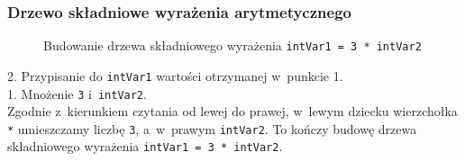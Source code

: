 \documentclass[10pt,t]{beamer}
\begin{document}
\begin{frame}
  \frametitle{Drzewo składniowe wyrażenia arytmetycznego}


  \begin{figure}


    \caption{Budowanie drzewa składniowego wyrażenia
      \texttt{intVar1 = 3 * intVar2}}

    \label{fig:Scheme-of-CPU}

  \end{figure}





  2. Przypisanie do \texttt{intVar1} wartości otrzymanej w~punkcie 1. \\
  1. Mnożenie \texttt{3} i~\texttt{intVar2}. \\
  Zgodnie z~kierunkiem czytania od lewej do prawej, w~lewym dziecku
  wierzchołka \texttt{*} umieszczamy liczbę \texttt{3}, a~w~prawym
  \texttt{intVar2}. To kończy budowę drzewa składniowego wyrażenia
  \texttt{intVar1 = 3 * intVar2}.

\end{frame}
\end{document}
